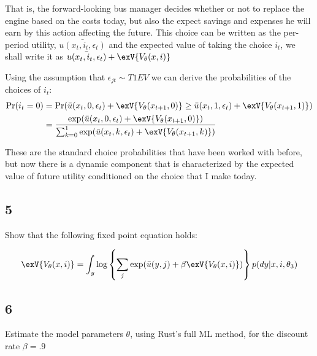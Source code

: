 \documentclass{paper}
\begin{document}
That is, the forward-looking bus manager decides whether or not to
replace the engine based on the costs today, but also the expect
savings and expenses he will earn by this action affecting the
future. This choice can be written as the per-period utility,
$\bar{u(x_t,i_t,\epsilon_t)}$ and the expected value of taking the choice
$i_t$, we shall write it as $\bar{u(x_t,i_t,\epsilon_t)} + \exV{V_{\theta}(x,i)}$


Using the assumption that $\epsilon_{jt} \sim T1EV$ we can derive the
probabilities of the choices of $i_t$:
\begin{align*}
  \Pr( i_t = 0) &= \Pr( \bar{u}(x_t,0,\epsilon_t) + \exV{V_{\theta}(x_{t+1},0)} \geq
                  \bar{u}(x_t,1,\epsilon_t) + \exV{V_{\theta}(x_{t+1},1)})\\
  &= \frac{\exp(\bar{u}(x_t,0,\epsilon_t) +
    \exV{V_{\theta}(x_{t+1},0)})}{\sum_{k=0}^1 \exp( \bar{u}(x_t,k,\epsilon_t) +
    \exV{V_{\theta}(x_{t+1},k)} )}\\
\end{align*}

These are the standard choice probabilities that have been worked with
before, but now there is a dynamic component that is characterized by
the expected value of future utility conditioned on the choice that I
make today.

\subsection{5}


Show that the following fixed point equation holds:

\begin{equation*}
  \exV{V_{\theta}(x,i)} = \int_y \log \left\{ \sum_j \exp( \bar{u}(y,j) + \beta
    \exV{V_{\theta}(x,i)}) \right\} p( dy \vert x,i,\theta_3)
\end{equation*}

\vspace{.3in}



\subsection{6}

Estimate the model parameters $\theta$, using Rust's full ML method, for
the discount rate $\beta = .9$
\end{document}
